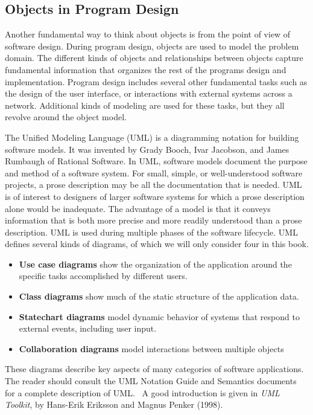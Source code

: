 \subsection[Objects in Program Design]{Objects in Program Design}
Another fundamental way to think about objects is
from the point of view of software design. During program design,
objects are used to model the problem domain. The different kinds of
objects and relationships between objects capture fundamental
information that organizes the rest of the program{\textquotesingle}s
design and implementation. Program design includes several other
fundamental tasks such as the design of the user interface, or
interactions with external systems across a network. Additional kinds
of modeling are used for these tasks, but they all revolve around the
object model.

The Unified Modeling Language (UML) is a diagramming notation
for building software models. It was invented by Grady Booch, Ivar
Jacobson, and James Rumbaugh of Rational Software. In UML, software
models document the purpose and method of a software system. For small,
simple, or well-understood software projects, a prose description may
be all the documentation that is needed. UML is of interest to
designers of larger software systems for which a prose description
alone would be inadequate. The advantage of a model is that it conveys
information that is both more precise and more readily understood than
a prose description. UML is used during multiple phases of the software
lifecycle. UML defines several kinds of diagrams, of which we will only
consider four in this book.

\begin{itemize}
\item \textbf{Use case diagrams} show the organization of the
application around the specific tasks accomplished by different users.
\item \textbf{Class diagrams} show much of the static structure of the
application data.
\item \textbf{Statechart diagrams} model dynamic behavior of systems
that respond to external events, including user input.
\item \textbf{Collaboration diagrams} model interactions between
multiple objects
\end{itemize}
These diagrams describe key aspects of many categories of software
applications. The reader should consult the UML Notation Guide and
Semantics documents for a complete description of UML. \ A good
introduction is given in \textit{UML Toolkit}, by Hans-Erik Eriksson
and Magnus Penker (1998).

